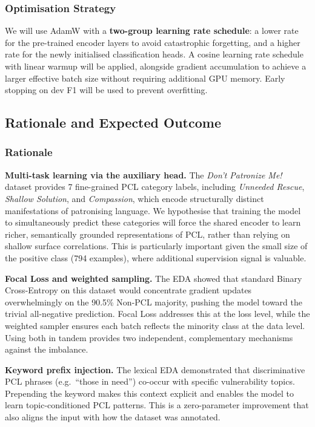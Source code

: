 \documentclass[11pt,a4paper]{article}
\begin{document}
\subsubsection{Optimisation Strategy}

We will use AdamW with a \textbf{two-group learning rate schedule}: a lower rate for the pre-trained encoder layers to avoid catastrophic forgetting, and a higher rate for the newly initialised classification heads. A cosine learning rate schedule with linear warmup will be applied, alongside gradient accumulation to achieve a larger effective batch size without requiring additional GPU memory. Early stopping on dev F1 will be used to prevent overfitting.

\subsection{Rationale and Expected Outcome}

\subsubsection{Rationale}

\textbf{Multi-task learning via the auxiliary head.}
The \textit{Don't Patronize Me!} dataset provides 7 fine-grained PCL category labels, including \textit{Unneeded Rescue}, \textit{Shallow Solution}, and \textit{Compassion}, which encode structurally distinct manifestations of patronising language. We hypothesise that training the model to simultaneously predict these categories will force the shared encoder to learn richer, semantically grounded representations of PCL, rather than relying on shallow surface correlations. This is particularly important given the small size of the positive class (794 examples), where additional supervision signal is valuable.

\textbf{Focal Loss and weighted sampling.}
The EDA showed that standard Binary Cross-Entropy on this dataset would concentrate gradient updates overwhelmingly on the 90.5\% Non-PCL majority, pushing the model toward the trivial all-negative prediction. Focal Loss addresses this at the loss level, while the weighted sampler ensures each batch reflects the minority class at the data level. Using both in tandem provides two independent, complementary mechanisms against the imbalance.

\textbf{Keyword prefix injection.}
The lexical EDA demonstrated that discriminative PCL phrases (e.g.\ ``those in need'') co-occur with specific vulnerability topics. Prepending the keyword makes this context explicit and enables the model to learn topic-conditioned PCL patterns. This is a zero-parameter improvement that also aligns the input with how the dataset was annotated.
\end{document}
